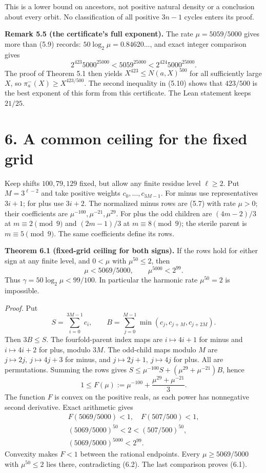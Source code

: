 \documentclass[11pt,a4paper]{article}
\begin{document}
This is a lower bound on ancestors, not positive natural density or a
conclusion about every orbit. No classification of all positive \(3n-1\)
cycles enters its proof.

\textbf{Remark 5.5 (the certificate's full exponent).} The rate
\(\mu=5059/5000\) gives more than (5.9) records:
\(50\log_2\mu=0.84620\ldots\), and exact integer comparison gives \[
2^{423}5000^{25000}<5059^{25000}<2^{424}5000^{25000}.
\tag{5.10}
\] The proof of Theorem 5.1 then yields \(X^{423}\le N(a,X)^{500}\) for
all sufficiently large \(X\), so \(\pi^-_a(X)\ge X^{423/500}\). The
second inequality in (5.10) shows that \(423/500\) is the best exponent
of this form from this certificate. The Lean statement keeps \(21/25\).

\section{6. A common ceiling for the fixed
grid}\label{a-common-ceiling-for-the-fixed-grid}

Keep shifts \(100,79,129\) fixed, but allow any finite residue level
\(\ell\ge2\). Put \(M=3^{\ell-2}\) and take positive weights
\(c_0,\ldots,c_{3M-1}\). For minus use representatives \(3i+1\); for
plus use \(3i+2\). The normalized minus rows are (5.7) with rate
\(\mu>0\); their coefficients are \(\mu^{-100},\mu^{-21},\mu^{29}\). For
plus the odd children are \((4m-2)/3\) at \(m\equiv2\pmod9\) and
\((2m-1)/3\) at \(m\equiv8\pmod9\); the sterile parent is
\(m\equiv5\pmod9\). The same coefficients define its rows.

\textbf{Theorem 6.1 (fixed-grid ceiling for both signs).} If the rows
hold for either sign at any finite level, and \(0<\mu\) with
\(\mu^{50}\le2\), then \[
\mu<5069/5000,\qquad \mu^{5000}<2^{99}.
\tag{6.1}
\] Thus \(\gamma=50\log_2\mu<99/100\). In particular the harmonic rate
\(\mu^{50}=2\) is impossible.

\emph{Proof.} Put \[
S=\sum_{i=0}^{3M-1}c_i,\qquad
B=\sum_{j=0}^{M-1}\min(c_j,c_{j+M},c_{j+2M}).
\] Then \(3B\le S\). The fourfold-parent index maps are \(i\mapsto4i+1\)
for minus and \(i\mapsto4i+2\) for plus, modulo \(3M\). The odd-child
maps modulo \(M\) are \(j\mapsto2j,\ j\mapsto4j+3\) for minus, and
\(j\mapsto2j+1,\ j\mapsto4j\) for plus. All are permutations. Summing
the rows gives \(S\le\mu^{-100}S+(\mu^{29}+\mu^{-21})B\), hence \[
1\le F(\mu):=\mu^{-100}+\frac{\mu^{29}+\mu^{-21}}3.
\tag{6.2}
\] The function \(F\) is convex on the positive reals, as each power has
nonnegative second derivative. Exact arithmetic gives \[
\begin{gathered}
F(5069/5000)<1,\quad F(507/500)<1,\\
(5069/5000)^{50}<2<(507/500)^{50},\\
(5069/5000)^{5000}<2^{99}.
\end{gathered}
\tag{6.3}
\] Convexity makes \(F<1\) between the rational endpoints. Every
\(\mu\ge5069/5000\) with \(\mu^{50}\le2\) lies there, contradicting
(6.2). The last comparison proves (6.1).
\end{document}
